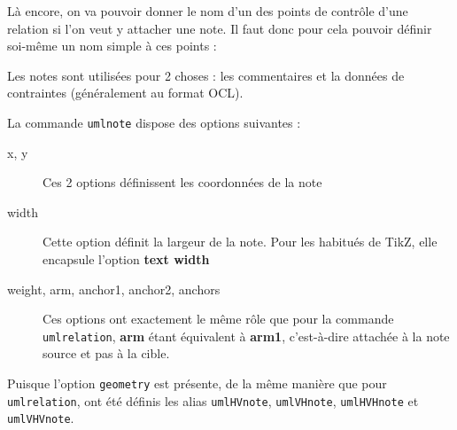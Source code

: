 \documentclass[a4paper,11pt]{report}
\newcommand{\inputTikZ}[1]{%
  }%
\newcommand{\inputTikZ}[1]{%
    \texttt{[image: fig/\#1.pdf]}%
  }%
\newcommand{\TikZ}{{\sc TikZ}}
\begin{document}
\medskip

Là encore, on va pouvoir donner le nom d'un des points de contrôle d'une relation si l'on veut y attacher une note. Il faut donc pour cela pouvoir définir soi-même un nom simple à ces points :

\medskip

\begin{minipage}{0.6\textwidth}

\end{minipage}
\begin{minipage}{0.4\textwidth}
\begin{center}
\inputTikZ{figure30}
\end{center}
\end{minipage}

\medskip

\medskip

Les notes sont utilisées pour 2 choses : les commentaires et la données de contraintes (généralement au format OCL).

\medskip

La commande {\tt umlnote} dispose des options suivantes :

\begin{description}
\item[x, y] Ces 2 options définissent les coordonnées de la note
\item[width] Cette option définit la largeur de la note. Pour les habitués de \TikZ, elle encapsule l'option {\bf text width}
\item[weight, arm, anchor1, anchor2, anchors] Ces options ont exactement le même rôle que pour la commande {\tt umlrelation}, {\bf arm} étant équivalent à {\bf arm1}, c'est-à-dire attachée à la note source et pas à la cible. 
\end{description}

\medskip

\begin{minipage}{0.6\textwidth}

\end{minipage}
\begin{minipage}{0.4\textwidth}
\begin{center}
\inputTikZ{figure31}
\end{center}
\end{minipage}

\medskip

\medskip

Puisque l'option {\tt geometry} est présente, de la même manière que pour {\tt umlrelation}, ont été définis les alias {\tt umlHVnote}, {\tt umlVHnote}, {\tt umlHVHnote} et {\tt umlVHVnote}.
\end{document}
